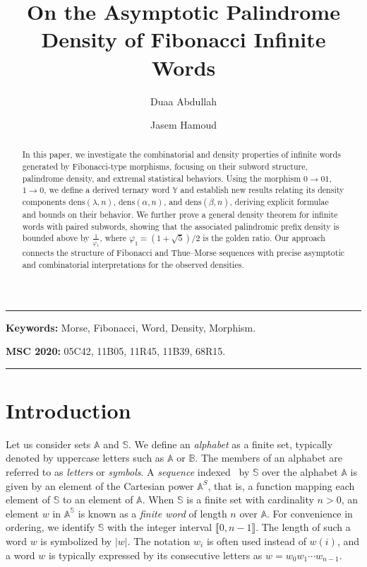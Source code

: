\documentclass[12pt]{amsart}
\author{Duaa Abdullah}
\author{Jasem Hamoud}
\title{On the Asymptotic Palindrome Density of Fibonacci Infinite Words}
\date{}
\begin{document}

\begin{abstract}
In this paper, we investigate the combinatorial and density properties of infinite words generated by Fibonacci-type morphisms, focusing on their subword structure, palindrome density, and extremal statistical behaviors. Using the morphism $0 \to 01$, $1 \to 0$, we define a derived ternary word $\mathbb{Y}$ and establish new results relating its density components $\mathrm{dens}(\lambda,n)$, $\mathrm{dens}(\alpha,n)$, and $\mathrm{dens}(\beta,n)$, deriving explicit formulae and bounds on their behavior. We further prove a general density theorem for infinite words with paired subwords, showing that the associated palindromic prefix density is bounded above by $\frac{1}{\varphi_1}$, where $\varphi_1 = (1 + \sqrt{5})/2$ is the golden ratio. Our approach connects the structure of Fibonacci and Thue--Morse sequences with precise asymptotic and combinatorial interpretations for the observed densities.
\end{abstract}

\maketitle


\noindent\rule{12.7cm}{1.0pt}

\noindent
\textbf{Keywords:} Morse, Fibonacci, Word, Density, Morphism.


\medskip

\noindent
{\bf MSC 2020:} 05C42, 11B05, 11R45, 11B39, 68R15.





\noindent\rule{12.7cm}{1.0pt}

\section{Introduction}\label{sec1}

Let us consider sets $\mathbb{A}$ and $\mathbb{S}$. We define an \emph{alphabet} as a finite set, typically denoted by uppercase letters such as $\mathbb{A}$ or $\mathbb{B}$. 
The members of an alphabet are referred to as \emph{letters} or \emph{symbols}. 
A \emph{sequence} indexed~\cite{Rigo2014} by $\mathbb{S}$ over the alphabet $\mathbb{A}$ is given by an element of the Cartesian power $\mathbb{A}^S$, that is, a function mapping each element of $\mathbb{S}$ to an element of $\mathbb{A}$. 
When $\mathbb{S}$ is a finite set with cardinality $n>0$, an element $w$ in $\mathbb{A}^\mathbb{S}$ is known as a \emph{finite word} of length $n$ over $\mathbb{A}$. 
For convenience in ordering, we identify $\mathbb{S}$ with the integer interval $\llbracket 0, n-1 \rrbracket$. 
The length of such a word $w$ is symbolized by $|w|$. 
The notation $w_i$ is often used instead of $w(i)$, and a word $w$ is typically expressed by its consecutive letters as $w = w_0 w_1 \cdots w_{n-1}.$
\end{document}
